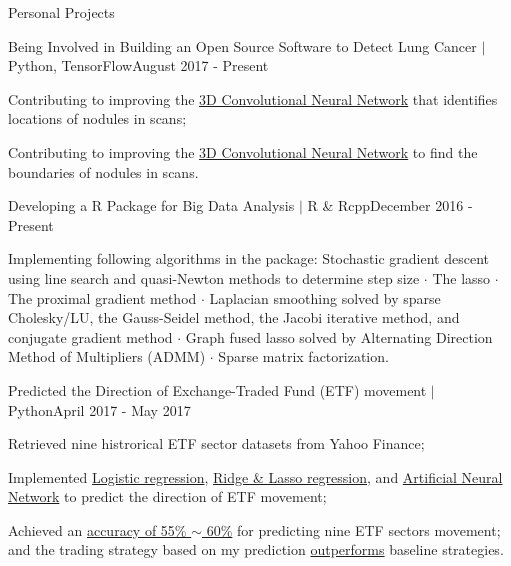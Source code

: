 \documentclass{my_resume} %
\begin{document}
\begin{rSection}{Personal Projects}
  \begin{rSubsection}{Being Involved in Building an Open Source Software to
      Detect Lung Cancer $|$ Python, TensorFlow}{}{August 2017 - Present}
    \item Contributing to improving the \underline{3D Convolutional Neural Network} that identifies
    locations of nodules in scans;
  \item Contributing to improving the \underline{3D Convolutional Neural Network} to find the
    boundaries of nodules in scans.
  \end{rSubsection}

  \begin{rSubsection}{Developing a R Package for Big Data Analysis $|$ R \&
    Rcpp}{}{December 2016 - Present}
  \item Implementing following algorithms in the package: Stochastic gradient
    descent using line search and quasi-Newton methods to determine step size
    {$\cdot$} The lasso {$\cdot$} The proximal gradient method {$\cdot$}
    Laplacian smoothing solved by sparse Cholesky/LU, the Gauss-Seidel method,
    the Jacobi iterative method, and conjugate gradient method {$\cdot$} Graph
    fused lasso solved by Alternating Direction Method of Multipliers (ADMM)
    {$\cdot$} Sparse matrix factorization.
  \end{rSubsection}

  \begin{rSubsection}{Predicted the Direction of Exchange-Traded Fund
    (ETF) movement $|$ Python}{}{April 2017 - May 2017}
  \item Retrieved nine histrorical ETF sector datasets from Yahoo Finance;
  \item Implemented \underline{Logistic regression}, \underline{Ridge \& Lasso
    regression}, and \underline{Artificial Neural Network} to predict the
    direction of ETF movement;
  \item Achieved an \underline{accuracy of 55\% $\sim$ 60\%} for predicting
    nine ETF sectors movement; and the trading strategy based on my prediction
    \underline{outperforms} baseline strategies.
  \end{rSubsection}



\end{rSection}
\end{document}
